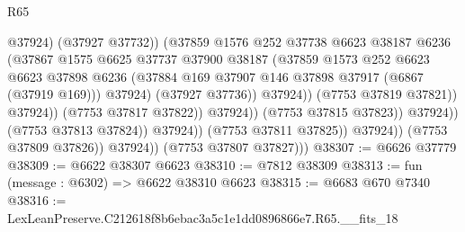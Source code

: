 \begin{lexlean}{R65}
\begin{coremodule}
{                                                  @37924)
                                                (@37927 @37732))
                                              (@37859
                                                @1576
                                                @252
                                                @37738
                                                @6623
                                                @38187
                                                @6236
                                                (@37867
                                                  @1575
                                                  @6625
                                                  @37737
                                                  @37900
                                                  @38187
                                                  (@37859
                                                    @1573
                                                    @252
                                                    @6623
                                                    @6623
                                                    @37898
                                                    @6236
                                                    (@37884
                                                      @169
                                                      @37907
                                                      @146
                                                      @37898
                                                      @37917
                                                      (@6867 (@37919 @169)))
                                                    @37924)
                                                  (@37927 @37736))
                                                @37924))
                                            (@7753 @37819 @37821))
                                          @37924))
                                      (@7753 @37817 @37822))
                                    @37924))
                                (@7753 @37815 @37823))
                              @37924))
                          (@7753 @37813 @37824))
                        @37924))
                    (@7753 @37811 @37825))
                  @37924))
              (@7753 @37809 @37826))
            @37924))
        (@7753 @37807 @37827)))
@38307 := @6626 @37779
@38309 := @6622 @38307 @6623
@38310 := @7812 @38309
@38313 := fun (message : @6302) => @6622 @38310 @6623
@38315 := @6683 @670 @7340
@38316 := LexLeanPreserve.C212618f8b6ebac3a5c1e1dd0896866e7.R65.__fits_18
}
\end{coremodule}
\end{lexlean}

